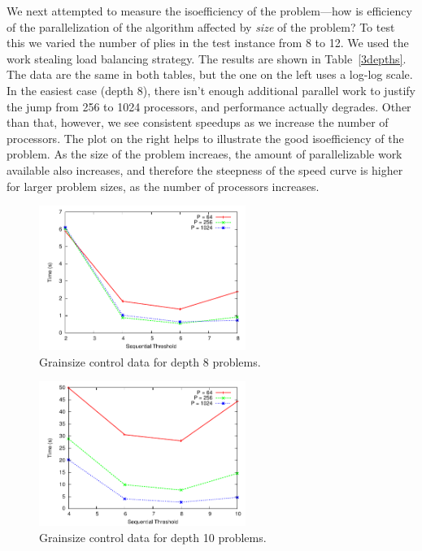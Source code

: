 \documentclass[conference]{IEEEtran}
\begin{document}
We next attempted to measure the isoefficiency of the problem---how is efficiency of the parallelization of the
algorithm affected by {\em size} of the problem?  To test this we varied the number of plies in the test instance from
8 to 12. We used the work stealing load balancing strategy.  The results are shown in Table~\ref{3depths}.  The data are
the same in both tables, but the one on the left uses a log-log scale.  In the easiest case (depth 8), there isn't
enough additional parallel work to justify the jump from 256 to 1024 processors, and performance actually degrades.
Other than that, however, we see consistent speedups as we increase the number of processors.  The plot on the right helps to
illustrate the good isoefficiency of the problem.  As the size of the problem increaes, the amount of parallelizable
work available also increases, and therefore the steepness of the speed curve is higher for larger problem sizes, as the
number of processors increases.
 
\begin{figure}[h]
\centering
\includegraphics[width=0.6\textwidth]{plots/dep8.pdf}
\caption{Grainsize control data for depth 8 problems.}
\label{dep8}
\end{figure}
 
\begin{figure}[h]
\centering
\includegraphics[width=0.6\textwidth]{plots/dep10.pdf}
\caption{Grainsize control data for depth 10 problems.}
\label{dep10}
\end{figure}
 
\end{document}
